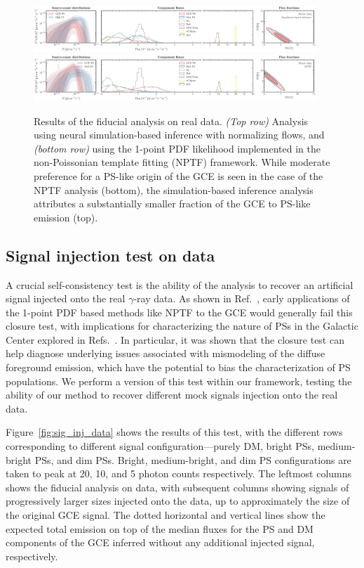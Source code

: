 \documentclass[prd,aps,10pt,nofootinbib,twocolumn,superscriptaddress,preprintnumbers,balancelastpage,longbibliography]{revtex4-1}
\begin{document}
%
\begin{figure}
    \centering
    \includegraphics[width=0.95\textwidth]{plots/data_fid_sbi.pdf}
    \includegraphics[width=0.95\textwidth]{plots/data_fid_nptf.pdf}
    \caption{Results of the fiducial analysis on real \Fermi data. \emph{(Top row)} Analysis using neural simulation-based inference with normalizing flows, and \emph{(bottom row)} using the 1-point PDF likelihood implemented in the non-Poissonian template fitting (NPTF) framework. While moderate preference for a PS-like origin of the GCE is seen in the case of the NPTF analysis (bottom), the simulation-based inference analysis attributes a substantially smaller fraction of the GCE to PS-like emission (top).}
    \label{fig:fid_data}
\end{figure}
%

\subsection{Signal injection test on data}
\label{sec:sig-injection}

A crucial self-consistency test is the ability of the analysis to recover an artificial signal injected onto the real $\gamma$-ray data. As shown in Ref.~\cite{Leane:2019xiy}, early applications of the 1-point PDF based methods like NPTF to the GCE would generally fail this closure test, with implications for characterizing the nature of PSs in the Galactic Center explored in Refs.~\cite{Chang:2019ars,Buschmann:2020adf}. In particular, it was shown that the closure test can help diagnose underlying issues associated with mismodeling of the diffuse foreground emission, which have the potential to bias the characterization of PS populations. We perform a version of this test within our framework, testing the ability of our method to recover different mock signals injection onto the real \Fermi data.

Figure~\ref{fig:sig_inj_data} shows the results of this test, with the different rows corresponding to different signal configuration---purely DM, bright PSs, medium-bright PSs, and dim PSs. Bright, medium-bright, and dim PS configurations are taken to peak at 20, 10, and 5 photon counts respectively. The leftmost columns shows the fiducial analysis on \Fermi data, with subsequent columns showing signals of progressively larger sizes injected onto the data, up to approximately the size of the original GCE signal. The dotted horizontal and vertical lines show the expected total emission on top of the median fluxes for the PS and DM components of the GCE inferred without any additional injected signal, respectively. 
\end{document}
